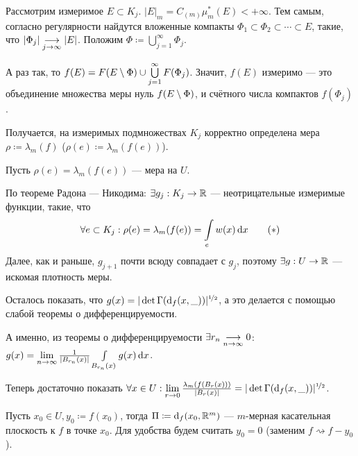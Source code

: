 \documentclass[a4paper]{report}
\begin{document}
{{            Рассмотрим измеримое $E \subset K_j$. $|E|_m = C_{(m)}\mu_m^*(E) < +\infty$.
            Тем самым, согласно регулярности найдутся вложенные компакты $\Phi_1 \subset \Phi_2 \subset \cdots \subset E$, такие, что $|\Phi_j| \underset{j \to \infty}{\longrightarrow} |E|$.
            Положим $\Phi \coloneqq \bigcup\limits_{j = 1}^{\infty}\Phi_j$.

            А раз так, то $f(E) = F(E \setminus \Phi) \cup \bigcup\limits_{j = 1}^{\infty}F(\Phi_j)$.
            Значит, $f(E)$ измеримо --- это объединение множества меры нуль $f(E \setminus \Phi)$, и счётного числа компактов $f(\Phi_j)$.

            Получается, на измеримых подмножествах $K_j$ корректно определена мера $\rho \coloneqq \lambda_m(f)$ ($\rho(e) \coloneqq \lambda_m(f(e))$).

            \item Пусть $\rho(e) = \lambda_m(f(e))$ --- мера на $U$.

            По теореме Радона --- Никодима: $\exists g_j: K_j \rightarrow \mathbb{R}$ --- неотрицательные измеримые функции, такие, что
            \[\forall e \subset K_j: \rho(e) = \lambda_m(f(e)) = \int\limits_{e}w(x)\operatorname{d}\! x\label{density}\tag{$*$}\]
            Далее, как и раньше, $g_{j + 1}$ почти всюду совпадает с $g_j$, поэтому $\exists g: U \rightarrow \mathbb{R}$ --- искомая плотность меры.

            \item Осталось показать, что $g(x) = |\det \Gamma(\operatorname{d}\!_f(x, \_))|^{\nicefrac12}$, а это делается с помощью слабой теоремы о дифференцируемости.

            А именно, из теоремы о дифференцируемости $\exists r_n \underset{n \to \infty}{\longrightarrow} 0$: $g(x) = \lim\limits_{n \to \infty}\frac{1}{|B_{r_n}(x)|}\int\limits_{B_{r_n}(x)}g(x) \operatorname{d}\! x$.

            Теперь достаточно показать $\forall x \in U: \lim\limits_{r \to 0}\frac{\lambda_m(f(B_r(x)))}{|B_r(x)|} = |\det \Gamma(\operatorname{d}\!_f(x, \_))|^{\nicefrac12}$.

            Пусть $x_0 \in U, y_0 \coloneqq f(x_0)$, тогда $\Pi \coloneqq \operatorname{d}\!_f(x_0, \mathbb{R}^m)$ --- $m$-мерная касательная плоскость к $f$ в точке $x_0$.
            Для удобства будем считать $y_0 = 0$ (заменим $f \rightsquigarrow f - y_0$).

}}
\end{document}
